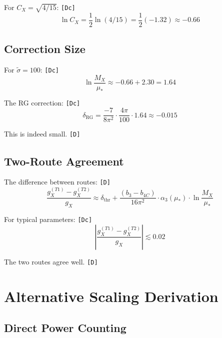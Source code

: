 \documentclass[11pt,a4paper]{article}
\newcommand{\tagD}{\textcolor{green!50!black}{\texttt{[D]}}}
\newcommand{\tagDc}{\textcolor{blue!70!black}{\texttt{[Dc]}}}
\theoremstyle{definition}
\begin{document}
For $C_X = \sqrt{4/15}$: \tagDc{}
\begin{equation}
\label{eq:app-log-2}
\ln C_X = \frac{1}{2}\ln(4/15) = \frac{1}{2}(-1.32) \approx -0.66
\end{equation}

\subsection{Correction Size}
\label{app:correction-size}

For $\tilde{\sigma} = 100$: \tagDc{}
\begin{equation}
\label{eq:app-corr-1}
\ln\frac{M_X}{\mu_*} \approx -0.66 + 2.30 = 1.64
\end{equation}

The RG correction: \tagDc{}
\begin{equation}
\label{eq:app-corr-2}
\delta_{\text{RG}} = \frac{-7}{8\pi^2} \cdot \frac{4\pi}{100} \cdot 1.64 \approx -0.015
\end{equation}

This is indeed small. \tagD{}

\subsection{Two-Route Agreement}
\label{app:two-route}

The difference between routes: \tagD{}
\begin{equation}
\label{eq:app-route-diff}
\frac{g_X^{(T1)} - g_X^{(T2)}}{g_X} \approx \delta_{\text{thr}} + \frac{(b_3 - b_{4C})}{16\pi^2} \cdot \alpha_3(\mu_*) \cdot \ln\frac{M_X}{\mu_*}
\end{equation}

For typical parameters: \tagDc{}
\begin{equation}
\label{eq:app-route-bound}
\left|\frac{g_X^{(T1)} - g_X^{(T2)}}{g_X}\right| \lesssim 0.02
\end{equation}

The two routes agree well. \tagD{}

\section{Alternative Scaling Derivation}
\label{app:alternative-scaling}

\subsection{Direct Power Counting}
\label{app:power-count}
\end{document}
